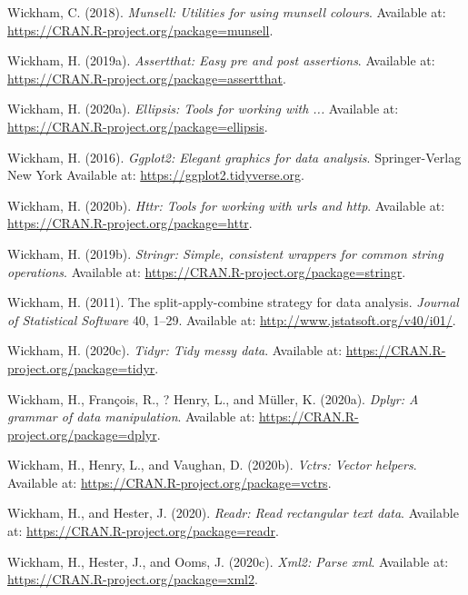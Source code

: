 \documentclass[utf8]{frontiersSCNS}
\newlength{\cslhangindent}
\newenvironment{cslreferences}%
  {\setlength{\parindent}{0pt}%
  \everypar{\setlength{\hangindent}{\cslhangindent}}\ignorespaces}%
  {\par}
\begin{document}
\begin{cslreferences}
\leavevmode\hypertarget{ref-wickham2018munsell}{}%
Wickham, C. (2018). \emph{Munsell: Utilities for using munsell colours}.
Available at: \url{https://CRAN.R-project.org/package=munsell}.

\leavevmode\hypertarget{ref-wickham2019assertthat}{}%
Wickham, H. (2019a). \emph{Assertthat: Easy pre and post assertions}.
Available at: \url{https://CRAN.R-project.org/package=assertthat}.

\leavevmode\hypertarget{ref-wickham2020ellipsis}{}%
Wickham, H. (2020a). \emph{Ellipsis: Tools for working with ...}
Available at: \url{https://CRAN.R-project.org/package=ellipsis}.

\leavevmode\hypertarget{ref-wickham2016ggplot2}{}%
Wickham, H. (2016). \emph{Ggplot2: Elegant graphics for data analysis}.
Springer-Verlag New York Available at:
\url{https://ggplot2.tidyverse.org}.

\leavevmode\hypertarget{ref-wickham2020httr}{}%
Wickham, H. (2020b). \emph{Httr: Tools for working with urls and http}.
Available at: \url{https://CRAN.R-project.org/package=httr}.

\leavevmode\hypertarget{ref-wickham2019stringr}{}%
Wickham, H. (2019b). \emph{Stringr: Simple, consistent wrappers for
common string operations}. Available at:
\url{https://CRAN.R-project.org/package=stringr}.

\leavevmode\hypertarget{ref-wickham2011split}{}%
Wickham, H. (2011). The split-apply-combine strategy for data analysis.
\emph{Journal of Statistical Software} 40, 1--29. Available at:
\url{http://www.jstatsoft.org/v40/i01/}.

\leavevmode\hypertarget{ref-wickham2020tidyr}{}%
Wickham, H. (2020c). \emph{Tidyr: Tidy messy data}. Available at:
\url{https://CRAN.R-project.org/package=tidyr}.

\leavevmode\hypertarget{ref-wickham2020dplyr}{}%
Wickham, H., François, R., ? Henry, L., and Müller, K. (2020a).
\emph{Dplyr: A grammar of data manipulation}. Available at:
\url{https://CRAN.R-project.org/package=dplyr}.

\leavevmode\hypertarget{ref-wickham2020vctrs}{}%
Wickham, H., Henry, L., and Vaughan, D. (2020b). \emph{Vctrs: Vector
helpers}. Available at: \url{https://CRAN.R-project.org/package=vctrs}.

\leavevmode\hypertarget{ref-wickham2020readr}{}%
Wickham, H., and Hester, J. (2020). \emph{Readr: Read rectangular text
data}. Available at: \url{https://CRAN.R-project.org/package=readr}.

\leavevmode\hypertarget{ref-wickham2020xml2}{}%
Wickham, H., Hester, J., and Ooms, J. (2020c). \emph{Xml2: Parse xml}.
Available at: \url{https://CRAN.R-project.org/package=xml2}.


\end{cslreferences}
\end{document}
